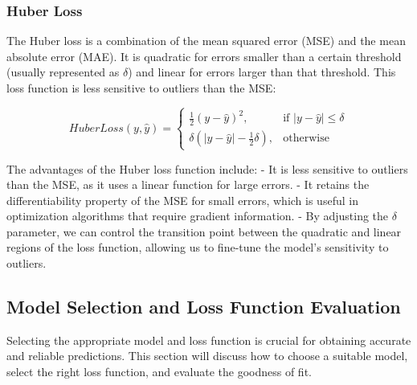 \documentclass{beamer}
\begin{document}
\subsubsection{Huber Loss}
\begin{center}
\end{center}

The Huber loss is a combination of the mean squared error (MSE) and the mean absolute error (MAE). It is quadratic for errors smaller than a certain threshold (usually represented as $\delta$) and linear for errors larger than that threshold. This loss function is less sensitive to outliers than the MSE:

\begin{equation}
HuberLoss(y, \hat{y}) = \begin{cases}
\frac{1}{2}(y - \hat{y})^2, & \text{if } |y - \hat{y}| \le \delta \\
\delta(|y - \hat{y}| - \frac{1}{2}\delta), & \text{otherwise}
\end{cases}
\end{equation}

The advantages of the Huber loss function include:
- It is less sensitive to outliers than the MSE, as it uses a linear function for large errors.
- It retains the differentiability property of the MSE for small errors, which is useful in optimization algorithms that require gradient information.
- By adjusting the $\delta$ parameter, we can control the transition point between the quadratic and linear regions of the loss function, allowing us to fine-tune the model's sensitivity to outliers.

\subsection{Model Selection and Loss Function Evaluation}

Selecting the appropriate model and loss function is crucial for obtaining accurate and reliable predictions. This section will discuss how to choose a suitable model, select the right loss function, and evaluate the goodness of fit.
\end{document}
